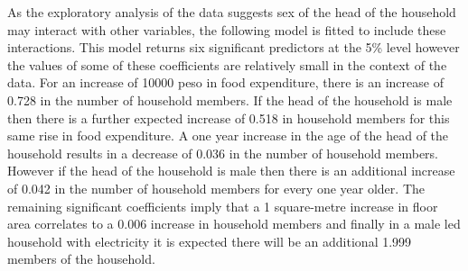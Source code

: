 \documentclass[
]{article}
\begin{document}
As the exploratory analysis of the data suggests sex of the head of the
household may interact with other variables, the following model is
fitted to include these interactions. This model returns six significant
predictors at the 5\% level however the values of some of these
coefficients are relatively small in the context of the data. For an
increase of 10000 peso in food expenditure, there is an increase of
0.728 in the number of household members. If the head of the household
is male then there is a further expected increase of 0.518 in household
members for this same rise in food expenditure. A one year increase in
the age of the head of the household results in a decrease of 0.036 in
the number of household members. However if the head of the household is
male then there is an additional increase of 0.042 in the number of
household members for every one year older. The remaining significant
coefficients imply that a 1 square-metre increase in floor area
correlates to a 0.006 increase in household members and finally in a
male led household with electricity it is expected there will be an
additional 1.999 members of the household.
\end{document}
